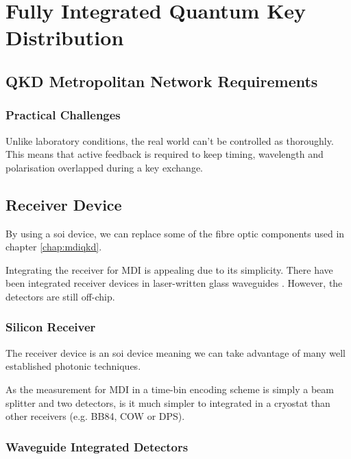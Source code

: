 %
% 
\graphicspath{{./chapters/chapter05/fig05/}}

\let\textcircled=\pgftextcircled
\chapter{Fully Integrated Quantum Key Distribution}
\label{chap:node}

\section{QKD Metropolitan Network Requirements}
\label{sec:sec05}

\subsection{Practical Challenges}

Unlike laboratory conditions, the real world can't be controlled as thoroughly. This means that active feedback is required to keep timing, wavelength and polarisation overlapped during a key exchange. 

\section{Receiver Device}

By using a \ac{soi} device, we can replace some of the fibre optic components used in chapter \ref{chap:mdiqkd}.

Integrating the receiver for \ac{MDI} is appealing due to its simplicity. There have been integrated receiver devices in laser-written glass waveguides \cite{wang2019}. However, the detectors are still off-chip.

\subsection{Silicon Receiver}

The receiver device is an \ac{soi} device meaning we can take advantage of many well established photonic techniques.

As the measurement for \ac{MDI} in a time-bin encoding scheme is simply a beam splitter and two detectors, is it much simpler to integrated in a cryostat than other receivers (e.g. BB84, COW or DPS).

\subsection{Waveguide Integrated Detectors}

